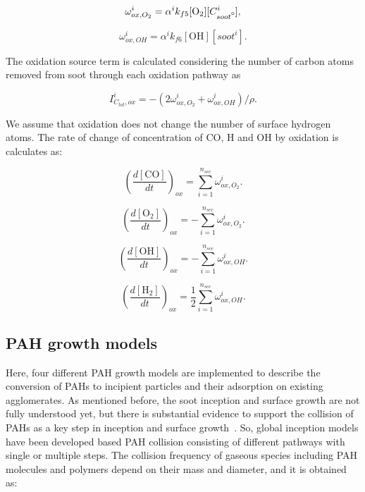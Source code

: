 \begin{equation}
	\omega^i_{ox,O_2} = \alpha^i k_{f5} [\mathrm{O_2}][C^i_{soot\mbox{\textdegree}}]
	\label{eqn:hacaO2Rate},
\end{equation}

\begin{equation}
	\omega^i_{ox,OH} = \alpha^i k_{f6} [\mathrm{OH}][soot^i]
	\label{eqn:hacaOHRate}.
\end{equation}

The oxidation source term is calculated considering the number of carbon atoms removed from soot through each oxidation pathway as

\begin{equation}
	I^i_{C_{tot},ox} = -(2\omega^i_{ox,O_2} + \omega^i_{ox,OH})/\rho
	\label{eqn:ICtot}.
\end{equation}

We assume that oxidation does not change the number of surface hydrogen atoms. The rate of change of concentration of CO, H and OH by oxidation is calculates as:

\begin{equation}
	\left(\frac{d\left[{\mathrm{CO}}\right]}{dt}\right)_{ox} = \sum_{i=1}^{n_{sec}}\omega^i_{ox,O_2}
	\label{eqn:COrate_ox}.
\end{equation}

\begin{equation}
	\left(\frac{d\left[{\mathrm{O_2}}\right]}{dt}\right)_{ox} = -\sum_{i=1}^{n_{sec}}\omega^i_{ox,O_2}
	\label{eqn:O2rate_ox}.
\end{equation}

\begin{equation}
	\left(\frac{d\left[{\mathrm{OH}}\right]}{dt}\right)_{ox} = -\sum_{i=1}^{n_{sec}}\omega^i_{ox,OH}
	\label{eqn:Hrate_ox}.
\end{equation}

\begin{equation}
	\left(\frac{d\left[{\mathrm{H_2}}\right]}{dt}\right)_{ox} = \frac{1}{2}\sum_{i=1}^{n_{sec}}\omega^i_{ox,OH}
	\label{eqn:OHrate_ox}.
\end{equation}

\subsection{PAH growth models}
\label{sec:pahgrowmodel}
Here, four different PAH growth models are implemented to describe the conversion of PAHs to incipient particles and their adsorption on existing agglomerates. As mentioned before, the soot inception and surface growth are not fully understood yet, but there is substantial evidence to support the collision of PAHs as a key step in inception and surface growth~\citep{zhao2003measurement, abid2009quantitative, happold2009soot}. So, global inception models have been developed based PAH collision consisting of different pathways with single or multiple steps. The collision frequency of gaseous species including PAH molecules and polymers depend on their mass and diameter, and it is obtained as:

